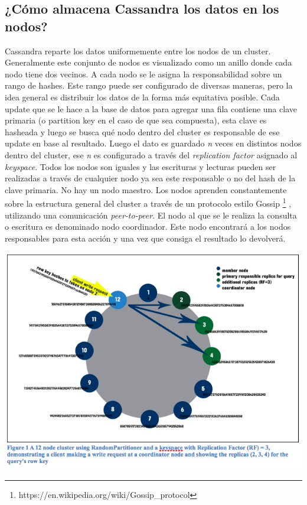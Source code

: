 \documentclass[11pt,a4paper]{article}
\begin{document}
\subsection{¿Cómo almacena Cassandra los datos en los nodos?}
Cassandra reparte los datos uniformemente entre los nodos de un cluster. Generalmente este conjunto de nodos es visualizado como un anillo donde cada nodo tiene dos vecinos. A cada nodo se le asigna la responsabilidad sobre un rango de hashes. Este rango puede ser configurado de diversas maneras, pero la idea general es distribuir los datos de la forma más equitativa posible. Cada update que se le hace a la base de datos para agregar una fila contiene una clave primaria (o partition key en el caso de que sea compuesta), esta clave es hasheada y luego se busca qué nodo dentro del cluster es responsable de ese update en base al resultado. Luego el dato es guardado \textit{n} veces en distintos nodos dentro del cluster, ese \textit{n} es configurado a través del \textit{replication factor} asignado al \textit{keyspace}. Todos los nodos son iguales y las escrituras y lecturas pueden ser realizadas a través de cualquier nodo ya sea este responsable o no del hash de la clave primaria. No hay un nodo maestro. Los nodos aprenden constantemente sobre la estructura general del cluster a través de un protocolo estilo Gossip \footnote{ https://en.wikipedia.org/wiki/Gossip\_protocol } , utilizando una comunicación \textit{peer-to-peer}. El nodo al que se le realiza la consulta o escritura es denominado nodo coordinador. Este nodo encontrará a los nodos responsables para esta acción y una vez que consiga el resultado lo devolverá. \\


\centerline{\includegraphics[scale=0.5]{imagenes/cassandra-ring}}
\end{document}
